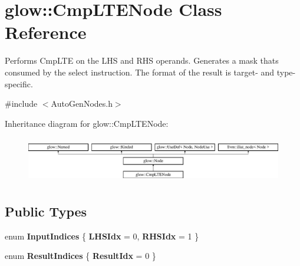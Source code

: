 \hypertarget{classglow_1_1_cmp_l_t_e_node}{}\section{glow\+:\+:Cmp\+L\+T\+E\+Node Class Reference}
\label{classglow_1_1_cmp_l_t_e_node}


Performs Cmp\+L\+TE on the L\+HS and R\+HS operands. Generates a mask that\textquotesingle{}s consumed by the select instruction. The format of the result is target-\/ and type-\/specific.  




{\ttfamily \#include $<$Auto\+Gen\+Nodes.\+h$>$}

Inheritance diagram for glow\+:\+:Cmp\+L\+T\+E\+Node\+:\begin{figure}[H]
\begin{center}
\leavevmode
\includegraphics[height=2.028986cm]{classglow_1_1_cmp_l_t_e_node}
\end{center}
\end{figure}
\subsection*{Public Types}
\begin{DoxyCompactItemize}
\item 
\mbox{\label{classglow_1_1_cmp_l_t_e_node_ada27d7c1bae262f5ff42c59d40546dcf}} 
enum {\bfseries Input\+Indices} \{ {\bfseries L\+H\+S\+Idx} = 0, 
{\bfseries R\+H\+S\+Idx} = 1
 \}
\item 
\mbox{\label{classglow_1_1_cmp_l_t_e_node_ad7827b974833df5c95c5eceab28bf1c2}} 
enum {\bfseries Result\+Indices} \{ {\bfseries Result\+Idx} = 0
 \}
\end{DoxyCompactItemize}
